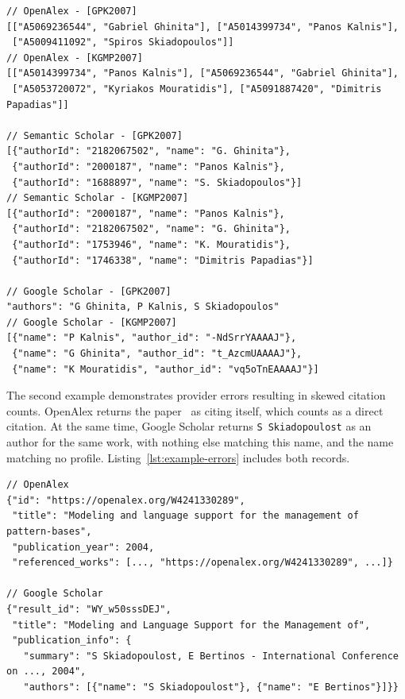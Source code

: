 \begin{lstlisting}[float=tb, basicstyle=\footnotesize\ttfamily, caption={Authors of {[GPK2007]} and {[KGMP2007]}, as returned by providers}, label={lst:example-coauthor}]
// OpenAlex - [GPK2007]
[["A5069236544", "Gabriel Ghinita"], ["A5014399734", "Panos Kalnis"],
 ["A5009411092", "Spiros Skiadopoulos"]]
// OpenAlex - [KGMP2007]
[["A5014399734", "Panos Kalnis"], ["A5069236544", "Gabriel Ghinita"],
 ["A5053720072", "Kyriakos Mouratidis"], ["A5091887420", "Dimitris Papadias"]]

// Semantic Scholar - [GPK2007]
[{"authorId": "2182067502", "name": "G. Ghinita"},
 {"authorId": "2000187", "name": "Panos Kalnis"},
 {"authorId": "1688897", "name": "S. Skiadopoulos"}]
// Semantic Scholar - [KGMP2007]
[{"authorId": "2000187", "name": "Panos Kalnis"},
 {"authorId": "2182067502", "name": "G. Ghinita"},
 {"authorId": "1753946", "name": "K. Mouratidis"},
 {"authorId": "1746338", "name": "Dimitris Papadias"}]

// Google Scholar - [GPK2007]
"authors": "G Ghinita, P Kalnis, S Skiadopoulos"
// Google Scholar - [KGMP2007]
[{"name": "P Kalnis", "author_id": "-NdSrrYAAAAJ"},
 {"name": "G Ghinita", "author_id": "t_AzcmUAAAAJ"},
 {"name": "K Mouratidis", "author_id": "vq5oTnEAAAAJ"}]
\end{lstlisting}

The second example demonstrates provider errors resulting in skewed citation counts.
\textsf{OpenAlex} returns the paper~\cite{Terrovitis2004} as citing itself, which counts as a \textsf{direct} citation.
At the same time, \textsf{Google Scholar} returns \texttt{S Skiadopoulost} as an author for the same work, with nothing else matching this name, and the name matching no profile.
Listing~\ref{lst:example-errors} includes both records.

\begin{lstlisting}[float=tb, basicstyle=\footnotesize\ttfamily, caption={Errors in the responses of \textsf{OpenAlex} and \textsf{Google Scholar}}, label={lst:example-errors}]
// OpenAlex
{"id": "https://openalex.org/W4241330289",
 "title": "Modeling and language support for the management of pattern-bases",
 "publication_year": 2004,
 "referenced_works": [..., "https://openalex.org/W4241330289", ...]}

// Google Scholar
{"result_id": "WY_w50sssDEJ",
 "title": "Modeling and Language Support for the Management of",
 "publication_info": {
   "summary": "S Skiadopoulost, E Bertinos - International Conference on ..., 2004",
   "authors": [{"name": "S Skiadopoulost"}, {"name": "E Bertinos"}]}}
\end{lstlisting}

